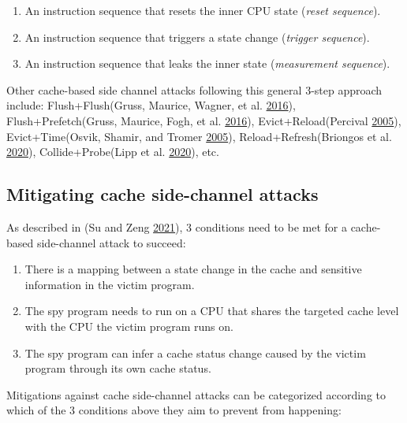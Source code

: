\documentclass[a4paper,]{report}
\providecommand{\tightlist}{%
  \setlength{\itemsep}{0pt}\setlength{\parskip}{0pt}}
\begin{document}
\begin{enumerate}
\def\labelenumi{\arabic{enumi}.}
\tightlist
\item
  An instruction sequence that resets the inner CPU state (\emph{reset
  sequence}).
\item
  An instruction sequence that triggers a state change (\emph{trigger
  sequence}).
\item
  An instruction sequence that leaks the inner state (\emph{measurement
  sequence}).
\end{enumerate}

Other cache-based side channel attacks following this general 3-step
approach include: Flush+Flush(Gruss, Maurice, Wagner,
et al. \protect\hyperlink{ref-Gruss2016a}{2016}),
Flush+Prefetch(Gruss, Maurice, Fogh, et al.
\protect\hyperlink{ref-Gruss2016}{2016}),
Evict+Reload(Percival
\protect\hyperlink{ref-Percival2005}{2005}),
Evict+Time(Osvik, Shamir, and Tromer
\protect\hyperlink{ref-Osvik2005}{2005}),
Reload+Refresh(Briongos et al.
\protect\hyperlink{ref-Briongos2020}{2020}),
Collide+Probe(Lipp et al.
\protect\hyperlink{ref-Lipp2020}{2020}), etc.

\hypertarget{mitigating-cache-side-channel-attacks}{%
\subsection{Mitigating cache side-channel
attacks}\label{mitigating-cache-side-channel-attacks}}

As described in (Su and Zeng \protect\hyperlink{ref-Su2021}{2021}), 3
conditions need to be met for a cache-based side-channel attack to
succeed:

\begin{enumerate}
\def\labelenumi{\arabic{enumi}.}
\item
  There is a mapping between a state change in the cache and sensitive
  information in the victim program.
\item
  The spy program needs to run on a CPU that shares the targeted cache
  level with the CPU the victim program runs on.
\item
  The spy program can infer a cache status change caused by the victim
  program through its own cache status.
\end{enumerate}

Mitigations against cache side-channel attacks can be categorized
according to which of the 3 conditions above they aim to prevent from
happening:
\end{document}
